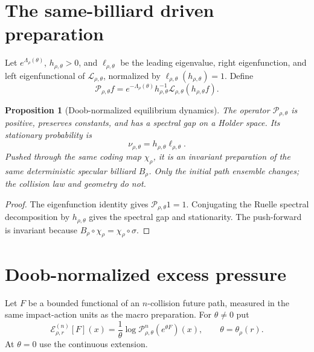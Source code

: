 \documentclass[11pt,reqno]{amsart}
\newtheorem{proposition}[theorem]{Proposition}
\theoremstyle{definition}
\theoremstyle{remark}
\newcommand{\cE}{\mathcal E}
\newcommand{\cP}{\mathcal P}
\newcommand{\cL}{\mathcal L}
\begin{document}
\section{The same-billiard driven preparation}\label{sec:doob}
Let $e^{\Lambda_\rho(\theta)}$, $h_{\rho,\theta}>0$, and
$\ell_{\rho,\theta}$ be the leading eigenvalue, right eigenfunction, and left
eigenfunctional of $\cL_{\rho,\theta}$, normalized by
$\ell_{\rho,\theta}(h_{\rho,\theta})=1$.  Define
\begin{equation}\label{eq:markov-op}
 \cP_{\rho,\theta}f
 =e^{-\Lambda_\rho(\theta)}
 h_{\rho,\theta}^{-1}
 \cL_{\rho,\theta}(h_{\rho,\theta}f).
\end{equation}

\begin{proposition}[Doob-normalized equilibrium dynamics]\label{prop:doob}
The operator $\cP_{\rho,\theta}$ is positive, preserves constants, and has a
spectral gap on a Holder space.  Its stationary probability is
\[
 \nu_{\rho,\theta}=h_{\rho,\theta}\ell_{\rho,\theta}.
\]
Pushed through the same coding map $\chi_\rho$, it is an invariant
preparation of the same deterministic specular billiard $B_\rho$.  Only the
initial path ensemble changes; the collision law and geometry do not.
\end{proposition}
\begin{proof}
The eigenfunction identity gives $\cP_{\rho,\theta}1=1$.  Conjugating the
Ruelle spectral decomposition by $h_{\rho,\theta}$ gives the spectral gap and
stationarity.  The push-forward is invariant because
$B_\rho\circ\chi_\rho=\chi_\rho\circ\sigma$.
\end{proof}

\section{Doob-normalized excess pressure}\label{sec:excess}
Let $F$ be a bounded functional of an $n$-collision future path, measured in
the same impact-action units as the macro preparation.  For $\theta\ne0$ put
\begin{equation}\label{eq:theta-eval}
 \cE_{\rho,r}^{(n)}[F](x)
 =\frac1\theta\log
 \cP_{\rho,\theta}^{n}(e^{\theta F})(x),
 \qquad \theta=\theta_\rho(r).
\end{equation}
At $\theta=0$ use the continuous extension.
\end{document}
